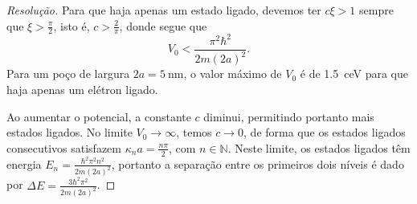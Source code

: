 \begin{proof}[Resolução]
    Para que haja apenas um estado ligado, devemos ter \(c \xi > 1\) sempre que \(\xi > \frac{\pi}{2}\), isto é, \(c > \frac{2}{\pi}\), donde segue que
    \begin{equation*}
        V_0 < \frac{\pi^2 \hbar^2}{2m(2a)^2}.
    \end{equation*}
    Para um poço de largura \(2a = \SI{5}{\nano\meter}\), o valor máximo de \(V_0\) é de \SI{1.5}{\centi\electronvolt} para que haja apenas um elétron ligado.

    Ao aumentar o potencial, a constante \(c\) diminui, permitindo portanto mais estados ligados. No limite \(V_0 \to \infty\), temos \(c \to 0\), de forma que os estados ligados consecutivos satisfazem \(\kappa_n a = \frac{n \pi}{2}\), com \(n \in \mathbb{N}\). Neste limite, os estados ligados têm energia \(E_n = \frac{\hbar^2\pi^2n^2}{2m(2a)^2}\), portanto a separação entre os primeiros dois níveis é dado por \(\Delta E = \frac{3\hbar^2 \pi^2}{2 m (2a)^2}\).
\end{proof}
